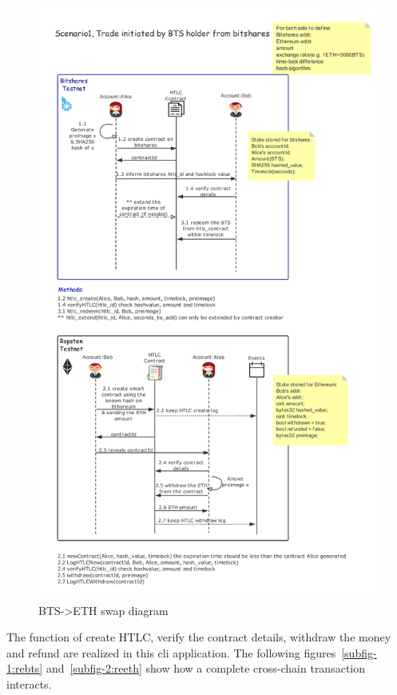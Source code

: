 \begin{figure}[H]
    \includegraphics[width=1\textwidth]{./figures/BTS-ETH_diagram}
        \centering
        \caption{BTS->ETH swap diagram}
        \centering
        \label{fig:success}

\end{figure}
\noindent The function of create HTLC, verify the contract details, withdraw the money and refund are realized in this cli application. The following figures~\ref{subfig-1:rebts} and~\ref{subfig-2:reeth} show how a complete cross-chain transaction interacts.\\

